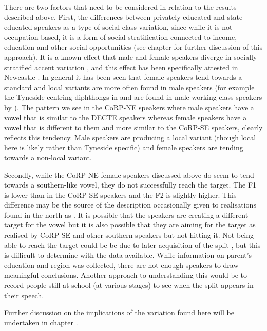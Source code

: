 \documentclass[../../../00.FullDoc/tex/ThesisSkeleton-draft2]{subfiles}
\begin{document}
There are two factors that need to be considered in relation to the results described above.
First, the differences between privately educated and state-educated speakers as a type of social class variation, since while it is not occupation based, it is a form of social stratification connected to income, education and other social opportunities (see chapter \notinsubfile{\ref{ch:LitReviewSocio}} for further discussion of this approach). It is a known effect that male and female speakers diverge in socially stratified accent variation \citep{Labov2001b}, and this effect has been specifically attested in Newcastle \citep{Watt1998}. In general it has been seen that female speakers tend towards a standard and local variants are more often found in male speakers (for example the Tyneside centring diphthongs in \goat{} and  are found in male working class speakers by \cite{Watt1998}). The pattern we see in the CoRP-NE speakers where male speakers have a \strutt{} vowel that is similar to the DECTE speakers whereas female speakers have a \strutt{} vowel that is different to them and more similar to the CoRP-SE speakers, clearly reflects this tendency. Male speakers are producing a local variant (though local here is likely  rather than Tyneside specific) and female speakers are tending towards a non-local variant.

Secondly, while the CoRP-NE female speakers discussed above do seem to tend towards a southern-like \strutt{} vowel, they do not successfully reach the target. The F1 is lower than in the CoRP-SE speakers and the F2 is slightly higher. This difference may be the source of the description occasionally given to \strutt{} realisations found in the north as  \citep{Braber2015,Jansen2020}. It is possible that the speakers are creating a different target for the \strutt{} vowel but it is also possible that they are aiming for the target as realised by CoRP-SE and other southern speakers but not hitting it. Not being able to reach the target could be be due to later acquisition of the split \citep{Evans2007} , but this is difficult to determine with the data available. While information on parent's education and region was collected, there are not enough speakers to draw meaningful conclusions. Another approach to understanding this would be to record people still at school (at various stages) to see when the \FS{} split appears in their speech.

Further discussion on the implications of the variation found here will be undertaken in chapter \notinsubfile{\ref{ch:Discussion}}.
\end{document}
